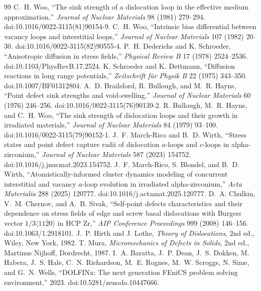 \documentclass[11pt]{article}
\begin{document}
\begin{thebibliography}{99}
 C.~H. Woo, ``The sink strength of a dislocation loop in the effective medium approximation,'' \emph{Journal of Nuclear Materials} 98 (1981) 279--294. doi:10.1016/0022-3115(81)90154-9.
 C.~H. Woo, ``Intrinsic bias differential between vacancy loops and interstitial loops,'' \emph{Journal of Nuclear Materials} 107 (1982) 20--30. doi:10.1016/0022-3115(82)90555-4.
 P.~H. Dederichs and K. Schroeder, ``Anisotropic diffusion in stress fields,'' \emph{Physical Review B} 17 (1978) 2524--2536. doi:10.1103/PhysRevB.17.2524.
 K. Schroeder and K. Dettmann, ``Diffusion reactions in long range potentials,'' \emph{Zeitschrift f\"ur Physik B} 22 (1975) 343--350. doi:10.1007/BF01312804.
 A.~D. Brailsford, R. Bullough, and M.~R. Hayns, ``Point defect sink strengths and void-swelling,'' \emph{Journal of Nuclear Materials} 60 (1976) 246--256. doi:10.1016/0022-3115(76)90139-2.
 R. Bullough, M.~R. Hayns, and C.~H. Woo, ``The sink strength of dislocation loops and their growth in irradiated materials,'' \emph{Journal of Nuclear Materials} 84 (1979) 93--100. doi:10.1016/0022-3115(79)90152-1.
 J.~F. March-Rico and B.~D. Wirth, ``Stress states and point defect capture radii of dislocation $a$-loops and $c$-loops in alpha-zirconium,'' \emph{Journal of Nuclear Materials} 587 (2023) 154752. doi:10.1016/j.jnucmat.2023.154752.
 J.~F. March-Rico, S. Blondel, and B.~D. Wirth, ``Atomistically-informed cluster dynamics modeling of concurrent interstitial and vacancy $a$-loop evolution in irradiated alpha-zirconium,'' \emph{Acta Materialia} 288 (2025) 120777. doi:10.1016/j.actamat.2025.120777.
 D.~A. Chulkin, V.~M. Chernov, and A.~B. Sivak, ``Self-point defects characteristics and their dependence on stress fields of edge and screw basal dislocations with Burgers vector $1/3\langle11\bar20\rangle$ in HCP Zr,'' \emph{AIP Conference Proceedings} 999 (2008) 146--156. doi:10.1063/1.2918101.
 J.~P. Hirth and J. Lothe, \emph{Theory of Dislocations}, 2nd ed., Wiley, New York, 1982.
 T. Mura, \emph{Micromechanics of Defects in Solids}, 2nd ed., Martinus Nijhoff, Dordrecht, 1987.
 I.~A. Baratta, J.~P. Dean, J.~S. Dokken, M. Habera, J.~S. Hale, C.~N. Richardson, M.~E. Rognes, M.~W. Scroggs, N. Sime, and G.~N. Wells, ``DOLFINx: The next generation FEniCS problem solving environment,'' 2023. doi:10.5281/zenodo.10447666.

\end{thebibliography}
\end{document}
